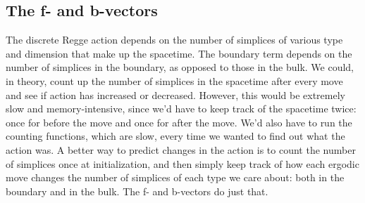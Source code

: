 \documentclass[12pt]{article}
\begin{document}
\subsection{The f- and b-vectors}
\label{s:f-and-b-vectors}

The discrete Regge action depends on the number of simplices of
various type and dimension that make up the spacetime. The boundary
term depends on the number of simplices in the boundary, as opposed to
those in the bulk. We could, in theory, count up the number of
simplices in the spacetime after every move and see if action has
increased or decreased. However, this would be extremely slow and
memory-intensive, since we'd have to keep track of the spacetime
twice: once for before the move and once for after the move. We'd also
have to run the counting functions, which are slow, every time we
wanted to find out what the action was. A better way to predict
changes in the action is to count the number of simplices once at
initialization, and then simply keep track of how each ergodic move
changes the number of simplices of each type we care about: both in
the boundary and in the bulk. The f- and b-vectors do just that.
\end{document}
